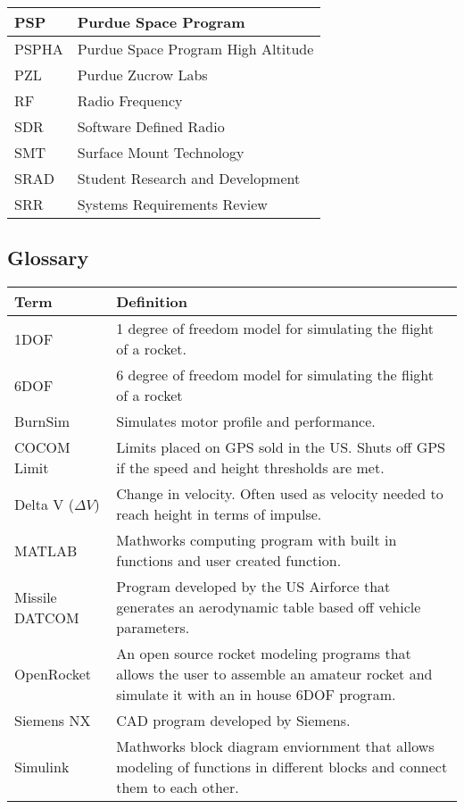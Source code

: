 \begin{table}[htbp]
\begin{tabular}{|p{5cm}|p{10cm}|}
        PSP & Purdue Space Program \\ \hline
        PSPHA & Purdue Space Program High Altitude \\ \hline
        PZL & Purdue Zucrow Labs \\ \hline
        RF & Radio Frequency \\ \hline
        SDR & Software Defined Radio \\ \hline
        SMT & Surface Mount Technology \\ \hline
        SRAD & Student Research and Development \\ \hline
        SRR & Systems Requirements Review \\ \hline
    \end{tabular}
\end{table}

\pagebreak

\subsection*{Glossary}

\begin{table}[htbp]\small
    \centering
    \begin{tabular}{|p{5cm}|p{10cm}|}
        \hline
        \textbf{Term} & \textbf{Definition} \\ \hline
        1DOF & 1 degree of freedom model for simulating the flight of a rocket. \\ \hline
        6DOF & 6 degree of freedom model for simulating the flight of a rocket \\ \hline
        BurnSim & Simulates motor profile and performance. \\ \hline
        COCOM Limit & Limits placed on GPS sold in the US. Shuts off GPS if the speed and height thresholds are met. \\ \hline
        Delta V (\(\Delta V\)) & Change in velocity. Often used as velocity needed to reach height in terms of impulse. \\ \hline
        MATLAB & Mathworks computing program with built in functions and user created function. \\ \hline
        Missile DATCOM & Program developed by the US Airforce that generates an aerodynamic table based off vehicle parameters. \\ \hline
        OpenRocket & An open source rocket modeling programs that allows the user to assemble an amateur rocket and simulate it with an in house 6DOF program. \\ \hline
        Siemens NX & CAD program developed by Siemens. \\ \hline
        Simulink & Mathworks block diagram enviornment that allows modeling of functions in different blocks and connect them to each other. \\ \hline
    \end{tabular}
\end{table}


\pagebreak